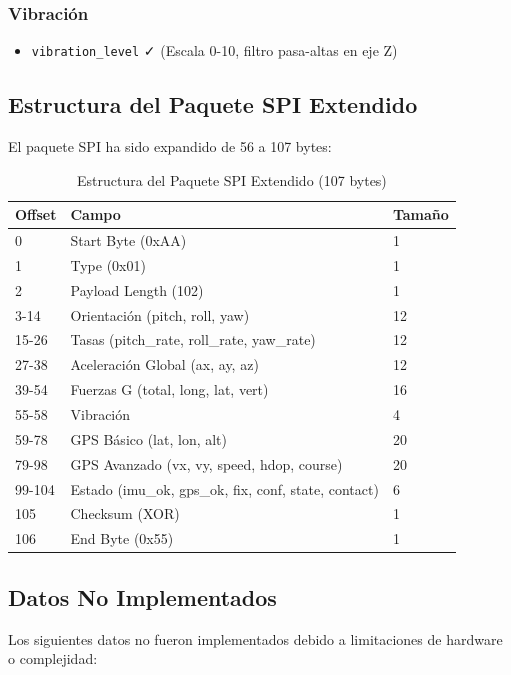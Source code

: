 \documentclass[11pt,a4paper]{article}
\begin{document}
\subsubsection{Vibración}
\begin{itemize}
    \item \texttt{vibration\_level} ✓ (Escala 0-10, filtro pasa-altas en eje Z)
\end{itemize}

\subsection{Estructura del Paquete SPI Extendido}

El paquete SPI ha sido expandido de 56 a 107 bytes:

\begin{table}[H]
\centering
\begin{tabular}{@{}lll@{}}
\toprule
\textbf{Offset} & \textbf{Campo} & \textbf{Tamaño} \\
\midrule
0 & Start Byte (0xAA) & 1 \\
1 & Type (0x01) & 1 \\
2 & Payload Length (102) & 1 \\
3-14 & Orientación (pitch, roll, yaw) & 12 \\
15-26 & Tasas (pitch\_rate, roll\_rate, yaw\_rate) & 12 \\
27-38 & Aceleración Global (ax, ay, az) & 12 \\
39-54 & Fuerzas G (total, long, lat, vert) & 16 \\
55-58 & Vibración & 4 \\
59-78 & GPS Básico (lat, lon, alt) & 20 \\
79-98 & GPS Avanzado (vx, vy, speed, hdop, course) & 20 \\
99-104 & Estado (imu\_ok, gps\_ok, fix, conf, state, contact) & 6 \\
105 & Checksum (XOR) & 1 \\
106 & End Byte (0x55) & 1 \\
\bottomrule
\end{tabular}
\caption{Estructura del Paquete SPI Extendido (107 bytes)}
\end{table}

\subsection{Datos No Implementados}

Los siguientes datos no fueron implementados debido a limitaciones de hardware o complejidad:
\end{document}
